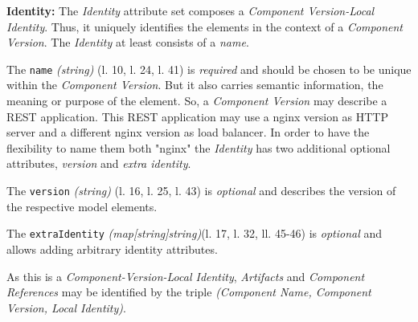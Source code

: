 \textbf{Identity:} The \emph{Identity} attribute set composes a \emph{Component Version-Local Identity}. Thus, it uniquely identifies the elements in the context of a \emph{Component Version}. The \emph{Identity} at least consists of a \emph{name}.\par 
The \lstinline|name| \emph{(string)}  (l. 10, l. 24, l. 41) is \emph{required} and should be chosen to be unique within the \emph{Component Version}. But it also carries semantic information, the meaning or purpose of the element. So, a \emph{Component Version} may describe a REST application. This REST application may use a nginx version as HTTP server and a different nginx version as load balancer. In order to have the flexibility to name them both "nginx" the \emph{Identity} has two additional optional attributes, \emph{version} and \emph{extra identity}.\par
The \lstinline|version| \emph{(string)} (l. 16, l. 25, l. 43) is \emph{optional} and describes the version of the respective model elements.\par
The \lstinline|extraIdentity| \emph{(map[string]string)}(l. 17, l. 32, ll. 45-46) is \emph{optional} and allows adding arbitrary identity attributes.\par
As this is a \emph{Component-Version-Local Identity}, \emph{Artifacts} and \emph{Component References} may be identified by the triple \emph{({Component Name}, {Component Version}, {Local Identity})}.\\

